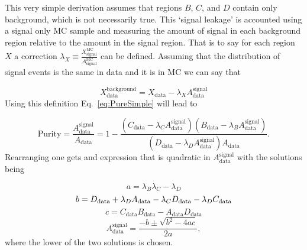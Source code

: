 This very simple derivation assumes that regions $B$, $C$, and $D$ contain only background, which is not necessarily true.  
This `signal leakage' is accounted using a signal only MC sample and measuring the amount of signal in each background region relative to the amount in the signal region.  
That is to say for each region $X$ a correction $\lambda_X\equiv\frac{X_{\mathrm{signal}}^{\mathrm{MC}}}{A_{\mathrm{signal}}^{\mathrm{MC}}}$ can be defined.  
Assuming that the distribution of signal events is the same in data and it is in MC we can say that

\begin{equation}
 X_{\mathrm{data}}^{\mathrm{background}} = X_{\mathrm{data}} - \lambda_XA_{\mathrm{data}}^{\mathrm{signal}}
\end{equation}
\noindent
Using this definition Eq.~\ref{eq:PureSimple} will lead to 

\begin{equation}
 \label{eq:PureLeakage}
 \mathrm{Purity} = \frac{A_{\mathrm{data}}^{\mathrm{signal}}}{A_{\mathrm{data}}} = 1-\frac{\left(C_{\mathrm{data}}-\lambda_CA_{\mathrm{data}}^{\mathrm{signal}}\right)\left(B_{\mathrm{data}}-\lambda_BA_{\mathrm{data}}^{\mathrm{signal}}\right)}{\left(D_{\mathrm{data}}-\lambda_DA_{\mathrm{data}}^{\mathrm{signal}}\right)A_{\mathrm{data}}}.  
\end{equation}
\noindent
Rearranging one gets and expression that is quadratic in $A_{\mathrm{data}}^{\mathrm{signal}}$ with the solutions being

\begin{equation}
 a=\lambda_B\lambda_C-\lambda_D 
\end{equation}
\begin{equation}
 b=D_{\mathrm{data}}+\lambda_DA_{\mathrm{data}}-\lambda_CD_{\mathrm{data}}-\lambda_DC_{\mathrm{data}} \\
\end{equation}
\begin{equation}
 c=C_{\mathrm{data}}B_{\mathrm{data}}-A_{\mathrm{data}}D_{\mathrm{data}}
\end{equation}
\begin{equation}
 A_{\mathrm{data}}^{\mathrm{signal}} = \frac{-b\pm\sqrt{b^2-4ac}}{2a}, 
\end{equation}
\noindent 
where the lower of the two solutions is chosen.  

